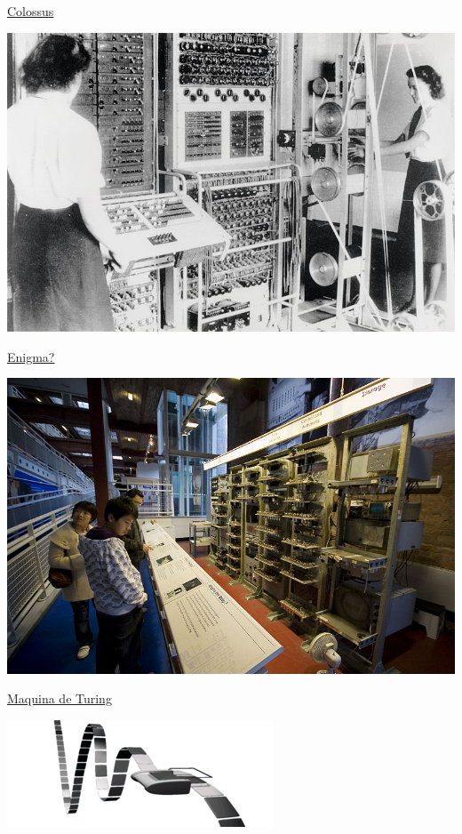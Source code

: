 \begin{center}
		\href{https://pt.wikipedia.org/wiki/Colossus_(computador)}{Colossus}

\includegraphics[width=.8\columnwidth]{./IMG-GIT/CIENTISTAS/Colossus.jpg}

\vfill\null
\columnbreak		

\href{https://pt.wikipedia.org/wiki/Enigma_(m\%C3\%A1quina)}{Enigma?}

\includegraphics[width=.8\columnwidth]{./IMG-GIT/CIENTISTAS/800px-SSEM_Manchester_museum.jpg}

\vfill\null
\columnbreak	

\href{https://pt.wikipedia.org/wiki/M\%C3\%A1quina_de_Turing}{Maquina de Turing}

\includegraphics[width=\linewidth]{./IMG-GIT/CIENTISTAS/300px-Turing_Machine.png}


\end{center}
